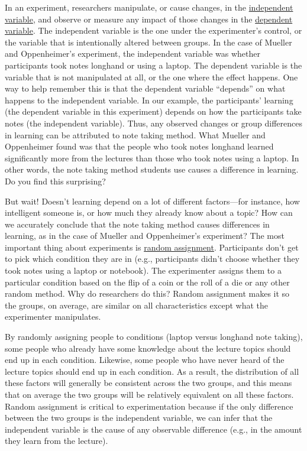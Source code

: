\documentclass[
]{krantz}
\begin{document}
In an experiment, researchers manipulate, or cause changes, in the \protect\hyperlink{independent-variable}{independent variable}, and observe or measure any impact of those changes in the \protect\hyperlink{dependent-variable}{dependent variable}. The independent variable is the one under the experimenter's control, or the variable that is intentionally altered between groups. In the case of Mueller and Oppenheimer's experiment, the independent variable was whether participants took notes longhand or using a laptop. The dependent variable is the variable that is not manipulated at all, or the one where the effect happens. One way to help remember this is that the dependent variable ``depends'' on what happens to the independent variable. In our example, the participants' learning (the dependent variable in this experiment) depends on how the participants take notes (the independent variable). Thus, any observed changes or group differences in learning can be attributed to note taking method. What Mueller and Oppenheimer found was that the people who took notes longhand learned significantly more from the lectures than those who took notes using a laptop. In other words, the note taking method students use causes a difference in learning. Do you find this surprising?

But wait! Doesn't learning depend on a lot of different factors---for instance, how intelligent someone is, or how much they already know about a topic? How can we accurately conclude that the note taking method causes differences in learning, as in the case of Mueller and Oppenheimer's experiment? The most important thing about experiments is \protect\hyperlink{random-assignment}{random assignment}. Participants don't get to pick which condition they are in (e.g., participants didn't choose whether they took notes using a laptop or notebook). The experimenter assigns them to a particular condition based on the flip of a coin or the roll of a die or any other random method. Why do researchers do this? Random assignment makes it so the groups, on average, are similar on all characteristics except what the experimenter manipulates.

By randomly assigning people to conditions (laptop versus longhand note taking), some people who already have some knowledge about the lecture topics should end up in each condition. Likewise, some people who have never heard of the lecture topics should end up in each condition. As a result, the distribution of all these factors will generally be consistent across the two groups, and this means that on average the two groups will be relatively equivalent on all these factors. Random assignment is critical to experimentation because if the only difference between the two groups is the independent variable, we can infer that the independent variable is the cause of any observable difference (e.g., in the amount they learn from the lecture).
\end{document}
